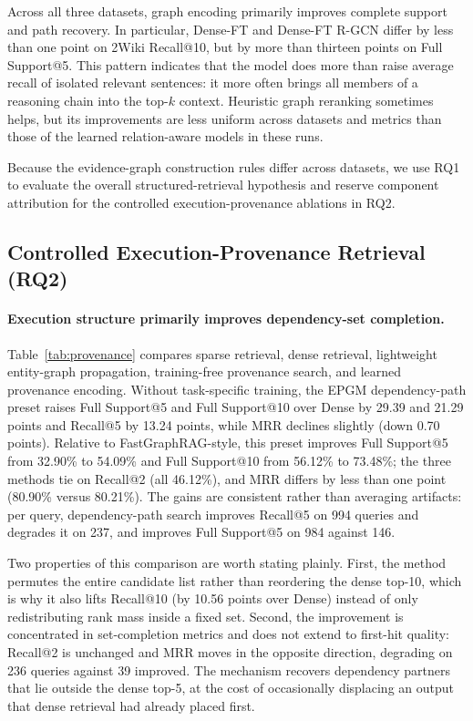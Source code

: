 Across all three datasets, graph encoding primarily improves complete
support and path recovery. In particular, Dense-FT and Dense-FT
R-GCN differ by less than one point on 2Wiki Recall@10, but by more
than thirteen points on Full Support@5. This pattern indicates that the
model does more than raise average recall of isolated relevant sentences:
it more often brings all members of a reasoning chain into the top-$k$
context. Heuristic graph reranking sometimes helps, but its improvements
are less uniform across datasets and metrics than those of the learned
relation-aware models in these runs.

Because the evidence-graph construction rules differ across datasets, we
use RQ1 to evaluate the overall structured-retrieval hypothesis and reserve
component attribution for the controlled execution-provenance ablations in
RQ2.

\subsection{Controlled Execution-Provenance Retrieval (RQ2)}

\paragraph{Execution structure primarily improves dependency-set
completion.}
Table~\ref{tab:provenance} compares sparse retrieval, dense retrieval,
lightweight entity-graph propagation, training-free provenance search,
and learned provenance encoding. Without task-specific training, the
EPGM dependency-path preset raises Full Support@5 and Full Support@10
over Dense by 29.39 and 21.29 points and Recall@5 by 13.24 points, while
MRR declines slightly (down 0.70 points). Relative to
FastGraphRAG-style, this preset improves Full Support@5 from 32.90\% to
54.09\% and Full Support@10 from 56.12\% to 73.48\%; the three methods
tie on Recall@2 (all 46.12\%), and MRR differs by less than one point
(80.90\% versus 80.21\%). The gains are consistent rather than
averaging artifacts: per query, dependency-path search improves
Recall@5 on 994 queries and degrades it on 237, and improves Full
Support@5 on 984 against 146.

Two properties of this comparison are worth stating plainly. First, the
method permutes the entire candidate list rather than reordering the dense
top-10, which is why it also lifts Recall@10 (by
10.56 points over Dense) instead of only redistributing rank mass inside
a fixed set. Second, the improvement is concentrated in set-completion
metrics and does not extend to first-hit quality: Recall@2 is unchanged
and MRR moves in the opposite direction, degrading on 236 queries against
39 improved. The mechanism recovers dependency partners that lie outside
the dense top-5, at the cost of occasionally displacing an output that
dense retrieval had already placed first.

